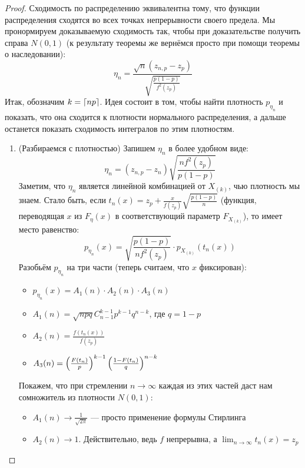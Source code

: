 \begin{proof}
	Сходимость по распределению эквивалентна тому, что функции распределения сходятся во всех точках непрерывности своего предела. Мы пронормируем доказываемую сходимость так, чтобы при доказательстве получить справа $N(0, 1)$ (к результату теоремы же вернёмся просто при помощи теоремы о наследовании):
	\[
		\eta_n = \frac{\sqrt{n}(z_{n, p} - z_p)}{\sqrt{\frac{p(1 - p)}{f^2(z_p)}}}
	\]
	Итак, обозначим $k = \left\lceil np\right\rceil$. Идея состоит в том, чтобы найти плотность $p_{\eta_n}$ и показать, что она сходится к плотности нормального распределения, а дальше останется показать сходимость интегралов по этим плотностям.
	\begin{enumerate}
		\item (Разбираемся с плотностью) Запишем $\eta_n$ в более удобном виде:
		\[
			\eta_n = (z_{n, p} - z_n)\sqrt{\frac{nf^2(z_p)}{p(1 - p)}}
		\]
		Заметим, что $\eta_n$ является линейной комбинацией от $X_{(k)}$, чью плотность мы знаем. Стало быть, если $t_n(x) = z_p + \frac{x}{f(z_p)}\sqrt{\frac{p(1 - p)}{n}}$ (функция, переводящая $x$ из $F_\eta(x)$ в соответствующий параметр $F_{X_{(k)}}$), то имеет место равенство:
		\[
			p_{\eta_n}(x) = \sqrt{\frac{p(1 - p)}{nf^2(z_p)}} \cdot p_{X_{(k)}}(t_n(x))
		\]
		Разобьём $p_{\eta_n}$ на три части (теперь считаем, что $x$ фиксирован):
		\begin{itemize}
			\item $p_{\eta_n}(x) = A_1(n) \cdot A_2(n) \cdot A_3(n)$
			
			\item $A_1(n) = \sqrt{npq}C_{n - 1}^{k - 1}p^{k - 1}q^{n - k}$, где $q = 1 - p$
			
			\item $A_2(n) = \frac{f(t_n(x))}{f(z_p)}$
			
			\item $A_3(n) = \left(\frac{F(t_n)}{p}\right)^{k - 1}\left(\frac{1 - F(t_n)}{q}\right)^{n - k}$
		\end{itemize}
		Покажем, что при стремлении $n \to \infty$ каждая из этих частей даст нам сомножитель из плотности $N(0, 1)$:
		\begin{itemize}
			\item $A_1(n) \to \frac{1}{\sqrt{2\pi}}$ --- просто применение формулы Стирлинга
			
			\item $A_2(n) \to 1$. Действительно, ведь $f$ непрерывна, а $\lim_{n \to \infty} t_n(x) = z_p$
			

\end{itemize}
\end{enumerate}
\end{proof}
